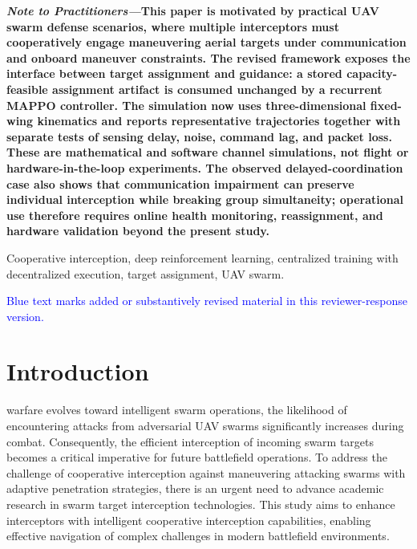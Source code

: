 \documentclass[lettersize,journal]{IEEEtran}
\begin{document}
{\color{blue}\linespread{0.9}\selectfont
\hspace*{0.0em}\textbf{\textit{Note to Practitioners—}}\textbf{This paper is motivated by practical UAV swarm defense scenarios, where multiple interceptors must cooperatively engage maneuvering aerial targets under communication and onboard maneuver constraints. The revised framework exposes the interface between target assignment and guidance: a stored capacity-feasible assignment artifact is consumed unchanged by a recurrent MAPPO controller. The simulation now uses three-dimensional fixed-wing kinematics and reports representative trajectories together with separate tests of sensing delay, noise, command lag, and packet loss. These are mathematical and software channel simulations, not flight or hardware-in-the-loop experiments. The observed delayed-coordination case also shows that communication impairment can preserve individual interception while breaking group simultaneity; operational use therefore requires online health monitoring, reassignment, and hardware validation beyond the present study.}\par\vspace{0.5\baselineskip}
}

\begin{IEEEkeywords}
Cooperative interception, deep reinforcement learning, centralized training with decentralized
execution, target assignment, UAV swarm.
\end{IEEEkeywords}

\noindent\textcolor{blue}{Blue text marks added or substantively revised material in this
reviewer-response version.}

\section{Introduction}
\label{sec:introduction}
 warfare evolves toward intelligent swarm operations, the likelihood of
encountering attacks from adversarial UAV swarms significantly increases during combat.
Consequently, the efficient interception of incoming swarm targets becomes a critical
imperative for future battlefield operations.
To address the challenge of cooperative interception against maneuvering attacking swarms with
adaptive penetration strategies, there is an urgent need to advance academic research in swarm
target interception technologies.
This study aims to enhance interceptors with intelligent cooperative interception capabilities,
enabling effective navigation of complex challenges in modern battlefield environments.
\end{document}
